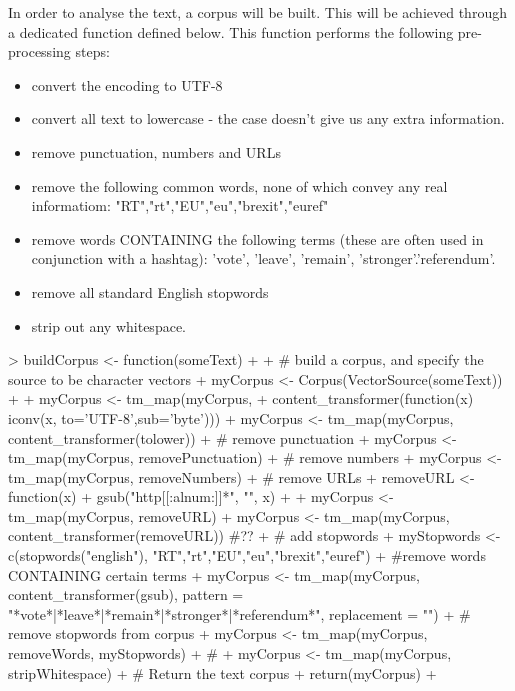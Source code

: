 \documentclass[10pt]{article}
\begin{document}
\hspace{1cm} 
In order to analyse the text, a corpus will be built. This will be achieved through a dedicated function defined below. This function performs the following pre-processing steps:

\begin{itemize}
  \item convert the encoding to UTF-8
  \item convert all text to lowercase - the case doesn't give us any extra information.
  \item remove punctuation, numbers and URLs
  \item remove the following common words, none of which convey any real informatiom: "RT","rt","EU","eu","brexit","euref"
  \item remove words CONTAINING the following terms (these are often used in conjunction with a hashtag): 'vote', 'leave', 'remain', 'stronger'.'referendum'.
  \item remove all standard English stopwords
  \item strip out any whitespace.
\end{itemize}
\hspace{1cm} 
\begin{Schunk}
\begin{Sinput}
> buildCorpus <- function(someText){
+   
+   # build a corpus, and specify the source to be character vectors
+   myCorpus <- Corpus(VectorSource(someText))
+ 
+   myCorpus <- tm_map(myCorpus,
+                      content_transformer(function(x) iconv(x, to='UTF-8',sub='byte')))
+   myCorpus <- tm_map(myCorpus, content_transformer(tolower))
+   # remove punctuation
+   myCorpus <- tm_map(myCorpus, removePunctuation)
+   # remove numbers
+   myCorpus <- tm_map(myCorpus, removeNumbers)
+   # remove URLs
+   removeURL <- function(x) {
+     gsub("http[[:alnum:]]*", "", x)
+   }
+   myCorpus <- tm_map(myCorpus, removeURL)
+   myCorpus <- tm_map(myCorpus, content_transformer(removeURL)) #??
+   # add stopwords
+   myStopwords <- c(stopwords("english"), "RT","rt","EU","eu","brexit","euref")
+   #remove words CONTAINING certain terms
+   myCorpus <- tm_map(myCorpus, content_transformer(gsub), pattern = "*vote*|*leave*|*remain*|*stronger*|*referendum*", replacement = "")
+   # remove stopwords from corpus
+   myCorpus <- tm_map(myCorpus, removeWords, myStopwords)
+   #
+   myCorpus <- tm_map(myCorpus, stripWhitespace)
+   # Return the text corpus
+   return(myCorpus)
+ }
\end{Sinput}
\end{Schunk}
\end{document}
